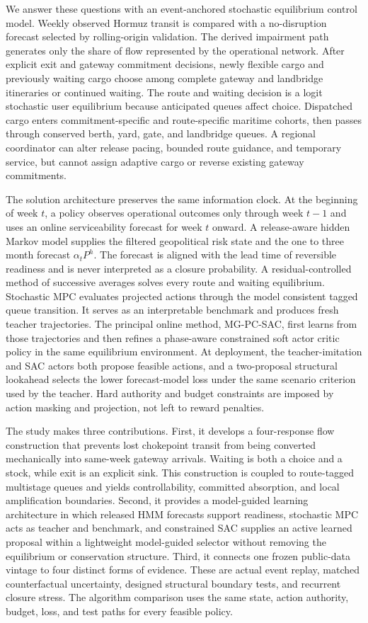 \documentclass[a4paper,fleqn]{cas-sc}
\begin{document}
We answer these questions with an event-anchored stochastic equilibrium control
model. Weekly observed Hormuz transit is compared with a no-disruption forecast
selected by rolling-origin validation. The derived impairment path generates
only the share of flow represented by the operational network. After explicit
exit and gateway commitment decisions, newly flexible cargo and previously
waiting cargo choose among complete gateway and landbridge itineraries or
continued waiting. The route and waiting decision is a logit stochastic user
equilibrium because anticipated queues affect choice. Dispatched cargo enters
commitment-specific and route-specific maritime cohorts, then passes through
conserved berth, yard, gate, and landbridge queues. A regional coordinator can
alter release pacing, bounded route guidance, and temporary service, but cannot
assign adaptive cargo or reverse existing gateway commitments.

The solution architecture preserves the same information clock. At the
beginning of week $t$, a policy observes operational outcomes only through week
$t-1$ and uses an online serviceability forecast for week $t$ onward. A
release-aware hidden Markov model supplies the filtered geopolitical risk state
and the one to three month forecast $\alpha_tP^h$. The forecast is aligned with
the lead time of reversible readiness and is never interpreted as a closure
probability. A residual-controlled method of successive averages solves every
route and waiting equilibrium. Stochastic MPC evaluates projected actions
through the model consistent tagged queue transition. It serves as an interpretable
benchmark and produces fresh teacher trajectories. The principal online method,
MG-PC-SAC, first learns from those trajectories and then refines a phase-aware
constrained soft actor critic policy in the same equilibrium environment. At
deployment, the teacher-imitation and SAC actors both propose feasible actions,
and a two-proposal structural lookahead selects the lower forecast-model loss
under the same scenario criterion used by the teacher. Hard
authority and budget constraints are imposed by action masking and projection,
not left to reward penalties.

The study makes three contributions. First, it develops a four-response flow
construction that prevents lost chokepoint transit from being converted
mechanically into same-week gateway arrivals. Waiting is both a choice and a
stock, while exit is an explicit sink. This construction is coupled to
route-tagged multistage queues and yields controllability, committed absorption,
and local amplification boundaries. Second, it provides a model-guided learning
architecture in which released HMM forecasts support readiness, stochastic MPC
acts as teacher and benchmark, and constrained SAC supplies an active learned
proposal within a lightweight model-guided selector without removing the
equilibrium or conservation structure. Third, it connects
one frozen public-data vintage to four distinct forms of evidence. These are
actual event replay, matched counterfactual uncertainty, designed structural
boundary tests, and recurrent closure stress. The algorithm comparison uses the
same state, action authority, budget, loss, and test paths for every feasible
policy.
\end{document}
